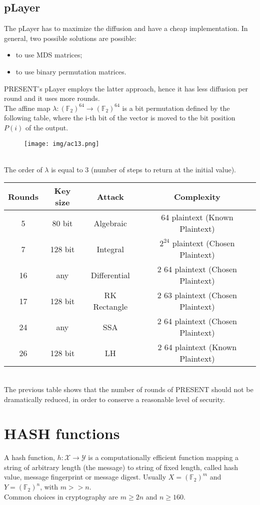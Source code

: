 \documentclass[a4paper, 10pt, titlepage]{article}
\begin{document}
\subsection*{pLayer}
The pLayer has to maximize the diffusion and have a cheap implementation. In general, two possible solutions are possible:
\begin{itemize}
\item to use MDS matrices;
\item to use binary permutation matrices.
\end{itemize}
PRESENT’s pLayer employs the latter approach, hence it has less diffusion per round and it uses more rounds.\\
The affine map $\lambda: (\mathbb{F}_2)^{64} \rightarrow (\mathbb{F}_2)^{64}$ is a bit permutation defined by the following table, where the i-th bit of the vector is moved to the bit
position $P(i)$ of the output.
\begin{figure}[h]
\centering
\texttt{[image: img/ac13.png]}
\end{figure} \\
The order of $\lambda$ is equal to 3 (number of steps to return at the initial value). \medskip \\
\begin{tabular}{|c|c|c|c|}\hline
Rounds & Key size &Attack & Complexity \\ \hline
5 & 80 bit &Algebraic & 64 plaintext (Known Plaintext) \\
7 & 128 bit &Integral & $2^{24}$ plaintext (Chosen Plaintext) \\
16 & any & Differential & 2 64 plaintext (Chosen Plaintext)\\
17 & 128 bit & RK Rectangle & 2 63 plaintext (Chosen Plaintext) \\
24 & any & SSA & 2 64 plaintext (Chosen Plaintext) \\
26 & 128 bit & LH & 2 64 plaintext (Known Plaintext) \\ \hline
\end{tabular} \medskip \\
The previous table shows that the number of rounds of PRESENT should not be dramatically reduced, in order to conserve a reasonable level of security.

\newpage
\section{HASH functions}
A hash function, $h : \mathcal{X} \rightarrow \mathcal{Y}$ is a computationally efficient function mapping a string of arbitrary length (the message) to string of fixed length, called hash value, message fingerprint or message digest. Usually $X = (\mathbb{F}_2)^m$ and $Y = (\mathbb{F}_2)^n$, with $m >> n$. \\
Common choices in cryptography are $m \geq 2n$ and $n \geq 160$. 
\end{document}
